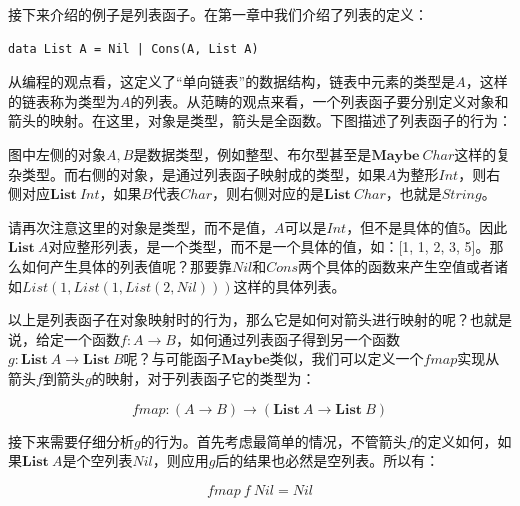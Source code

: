 \documentclass[b5paper]{ctexart}
\begin{document}
\begin{example}
接下来介绍的例子是列表函子。在第一章中我们介绍了列表的定义：

\lstset{frame=none}
\begin{lstlisting}
data List A = Nil | Cons(A, List A)
\end{lstlisting}

从编程的观点看，这定义了“单向链表”的数据结构，链表中元素的类型是$A$，这样的链表称为类型为$A$的列表。从范畴的观点来看，一个列表函子要分别定义对象和箭头的映射。在这里，对象是类型，箭头是全函数。下图描述了列表函子的行为：

\begin{center}
\end{center}

图中左侧的对象$A, B$是数据类型，例如整型、布尔型甚至是$\mathbf{Maybe}\ Char$这样的复杂类型。而右侧的对象，是通过列表函子映射成的类型，如果$A$为整形$Int$，则右侧对应$\mathbf{List}\ Int$，如果$B$代表$Char$，则右侧对应的是$\mathbf{List}\ Char$，也就是$String$。

请再次注意这里的对象是类型，而不是值，$A$可以是$Int$，但不是具体的值5。因此$\mathbf{List}\ A$对应整形列表，是一个类型，而不是一个具体的值，如：[1, 1, 2, 3, 5]。那么如何产生具体的列表值呢？那要靠$Nil$和$Cons$两个具体的函数来产生空值或者诸如$List(1, List(1, List(2, Nil)))$这样的具体列表。

以上是列表函子在对象映射时的行为，那么它是如何对箭头进行映射的呢？也就是说，给定一个函数$f: A \to B$，如何通过列表函子得到另一个函数$g: \mathbf{List}\ A \to \mathbf{List}\ B$呢？与可能函子$\mathbf{Maybe}$类似，我们可以定义一个$fmap$实现从箭头$f$到箭头$g$的映射，对于列表函子它的类型为：

\[
fmap: (A \to B) \to (\mathbf{List}\ A \to \mathbf{List}\ B)
\]

接下来需要仔细分析$g$的行为。首先考虑最简单的情况，不管箭头$f$的定义如何，如果$\mathbf{List}\ A$是个空列表$Nil$，则应用$g$后的结果也必然是空列表。所以有：

\[
fmap\ f\ Nil = Nil
\]


\end{example}
\end{document}
